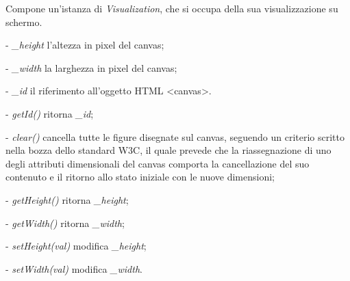 Compone un'istanza di \textit{Visualization}, che si occupa della sua visualizzazione su schermo.
\begin{elencopuntato}[\subsubsecindent]
\item[-] \textit{{\_}height} l'altezza in pixel del canvas;
\item[-] \textit{{\_}width} la larghezza in pixel del canvas;
\item[-] \textit{{\_}id} il riferimento all'oggetto HTML <canvas>.
\end{elencopuntato}
\begin{elencopuntato}[\subsubsecindent]
\item[-] \textit{getId()} ritorna  \textit{{\_}id};
\item[-] \textit{clear()} cancella tutte le figure disegnate sul canvas, seguendo un criterio scritto nella bozza dello standard W3C, il quale prevede che la riassegnazione di uno degli attributi dimensionali del canvas comporta la cancellazione del suo contenuto e il ritorno allo stato iniziale con le nuove dimensioni;
\item[-] \textit{getHeight()} ritorna  \textit{{\_}height};
\item[-] \textit{getWidth()} ritorna  \textit{{\_}width};
\item[-] \textit{setHeight(val)} modifica \textit{{\_}height};
\item[-] \textit{setWidth(val)} modifica \textit{{\_}width}.
\end{elencopuntato}


